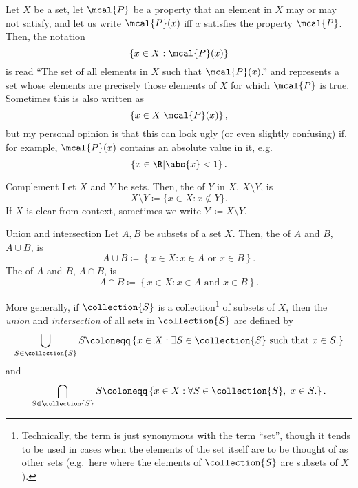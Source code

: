 \begin{rmk}
Let $X$ be a set, let $\mcal{P}$ be a property that an element in $X$ may or may not satisfy, and let us write $\mcal{P}(x)$ iff $x$ satisfies the property $\mcal{P}$.  Then, the notation
\begin{equation*}
\left\{ x\in X:\mcal{P}(x)\right\}
\end{equation*}
is read ``The set of all elements in $X$ such that $\mcal{P}(x)$.'' and represents a set whose elements are precisely those elements of $X$ for which $\mcal{P}$ is true.  Sometimes this is also written as
\begin{equation*}
\left\{ x\in X|\mcal{P}(x)\right\} ,
\end{equation*}
but my personal opinion is that this can look ugly (or even slightly confusing) if, for example, $\mcal{P}(x)$ contains an absolute value in it, e.g.
\begin{equation*}
\left\{ x\in \R |\abs{x}<1\right\} .
\end{equation*}
\end{rmk}
\begin{dfn}{Complement}{}
Let $X$ and $Y$ be sets.  Then, the  of $Y$ in $X$, $X\setminus Y$, is
\begin{equation}
X\setminus Y\coloneqq \{ x\in X:x\notin Y\} .
\end{equation}
If $X$ is clear from context, sometimes we write $Y^{\comp}\coloneqq X\setminus Y$.
\end{dfn}
\begin{dfn}{Union and intersection}{}
Let $A,B$ be subsets of a set $X$.  Then, the  of $A$ and $B$, $A\cup B$, is
\begin{equation}
A\cup B\coloneqq \left\{ x\in X:x\in A\text{ or }x\in B\right\} .
\end{equation}
The  of $A$ and $B$, $A\cap B$, is
\begin{equation}
A\cap B\coloneqq \left\{ x\in X:x\in A\text{ and }x\in B\right\} .
\end{equation}
\begin{rmk}
More generally, if $\collection{S}$ is a collection\footnote{Technically, the term  is just synonymous with the term ``set'', though it tends to be used in cases when the elements of the set itself are to be thought of as other sets (e.g.~here where the elements of $\collection{S}$ are subsets of $X$).} of subsets of $X$, then the \emph{union} and \emph{intersection} of all sets in $\collection{S}$ are defined by
\begin{equation}
\bigcup _{S\in \collection{S}}S\coloneqq \left\{ x\in X:\exists S\in \collection{S}\text{ such that }x\in S\text{.}\right\}
\end{equation}
and
\begin{equation}
\bigcap _{S\in \collection{S}}S\coloneqq \left\{ x\in X:\forall S\in \collection{S},\ x\in S\text{.}\right\} .
\end{equation}
\end{rmk}
\end{dfn}
